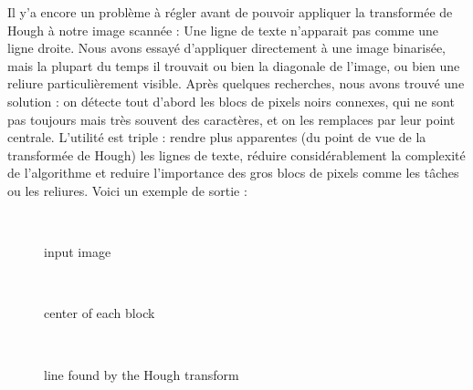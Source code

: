 Il y'a encore un problème à régler avant de pouvoir appliquer la transformée de Hough à notre image scannée : Une ligne de texte n'apparait pas comme une ligne droite. Nous avons essayé d'appliquer directement à une image binarisée, mais la plupart du temps il trouvait ou bien la diagonale de l'image, ou bien une reliure particulièrement visible. Après quelques recherches, nous avons trouvé une solution : on détecte tout d'abord les blocs de pixels noirs connexes, qui ne sont pas toujours mais très souvent des caractères, et on les remplaces par leur point centrale. L'utilité est triple : rendre plus apparentes (du point de vue de la transformée de Hough) les lignes de texte, réduire considérablement la complexité de l'algorithme et reduire l'importance des gros blocs de pixels comme les tâches ou les reliures. Voici un exemple de sortie :

\begin{figure}[h!]\
    \centering
    \caption{input image}
\end{figure}
\begin{figure}[h!]\
    \centering
    \caption{center of each block}
\end{figure}
\begin{figure}[h!]\
    \centering
    \caption{line found by the Hough transform}
\end{figure}
